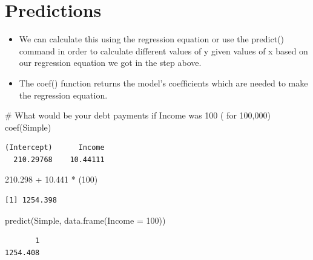 \documentclass[
  letterpaper,
  DIV=11,
  numbers=noendperiod]{scrreprt}
\newenvironment{Shaded}{\begin{snugshade}}{\end{snugshade}}
\newcommand{\AttributeTok}[1]{\textcolor[rgb]{0.40,0.45,0.13}{#1}}
\newcommand{\CommentTok}[1]{\textcolor[rgb]{0.37,0.37,0.37}{#1}}
\newcommand{\DecValTok}[1]{\textcolor[rgb]{0.68,0.00,0.00}{#1}}
\newcommand{\FloatTok}[1]{\textcolor[rgb]{0.68,0.00,0.00}{#1}}
\newcommand{\FunctionTok}[1]{\textcolor[rgb]{0.28,0.35,0.67}{#1}}
\newcommand{\NormalTok}[1]{\textcolor[rgb]{0.00,0.23,0.31}{#1}}
\newcommand{\SpecialCharTok}[1]{\textcolor[rgb]{0.37,0.37,0.37}{#1}}
\providecommand{\tightlist}{%
  \setlength{\itemsep}{0pt}\setlength{\parskip}{0pt}}\usepackage{longtable,booktabs,array}
\begin{document}
\section{Predictions}\label{predictions}

\begin{itemize}
\tightlist
\item
  We can calculate this using the regression equation or use the
  predict() command in order to calculate different values of y given
  values of x based on our regression equation we got in the step above.
\item
  The coef() function returns the model's coefficients which are needed
  to make the regression equation.
\end{itemize}

\begin{Shaded}
\begin{Highlighting}[]
\CommentTok{\# What would be your debt payments if Income was 100 ( for 100,000)}
\FunctionTok{coef}\NormalTok{(Simple)}
\end{Highlighting}
\end{Shaded}

\begin{verbatim}
(Intercept)      Income 
  210.29768    10.44111 
\end{verbatim}

\begin{Shaded}
\begin{Highlighting}[]
\FloatTok{210.298} \SpecialCharTok{+} \FloatTok{10.441} \SpecialCharTok{*}\NormalTok{ (}\DecValTok{100}\NormalTok{)}
\end{Highlighting}
\end{Shaded}

\begin{verbatim}
[1] 1254.398
\end{verbatim}

\begin{Shaded}
\begin{Highlighting}[]
\FunctionTok{predict}\NormalTok{(Simple, }\FunctionTok{data.frame}\NormalTok{(}\AttributeTok{Income =} \DecValTok{100}\NormalTok{))}
\end{Highlighting}
\end{Shaded}

\begin{verbatim}
       1 
1254.408 
\end{verbatim}

\end{document}
